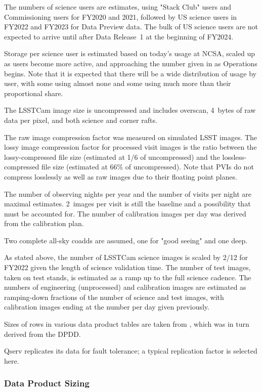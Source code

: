 The numbers of science users are estimates, using "Stack Club" users and Commissioning users for FY2020 and 2021, followed by US science users in FY2022 and FY2023 for Data Preview data.
The bulk of US science users are not expected to arrive until after Data Release~1 at the beginning of FY2024.

Storage per science user is estimated based on today's usage at NCSA, scaled up as users become more active, and approaching the number given in  as Operations begins.
Note that it is expected that there will be a wide distribution of usage by user, with some using almost none and some using much more than their proportional share.

The LSSTCam image size is uncompressed and includes overscan, 4~bytes of raw data per pixel, and both science and corner rafts.

The raw image compression factor was measured on simulated LSST images.
The lossy image compression factor for processed visit images is the ratio between the lossy-compressed file size (estimated at 1/6 of uncompressed) and the lossless-compressed file size (estimated at 66\% of uncompressed).
Note that PVIs do not compress losslessly as well as raw images due to their floating point planes.

The number of observing nights per year and the number of visits per night are maximal estimates.
2~images per visit is still the baseline and a possibility that must be accounted for.
The number of calibration images per day was derived from the calibration plan.

Two complete all-sky coadds are assumed, one for "good seeing" and one deep.

As stated above, the number of LSSTCam science images is scaled by 2/12 for FY2022 given the length of science validation time.
The number of test images, taken on test stands, is estimated as a ramp up to the full science cadence.
The numbers of engineering (unprocessed) and calibration images are estimated as ramping-down fractions of the number of science and test images, with calibration images ending at the number per day given previously.

Sizes of rows in various data product tables are taken from , which was in turn derived from the DPDD.

Qserv replicates its data for fault tolerance; a typical replication factor is selected here.

\subsubsection{Data Product Sizing}

